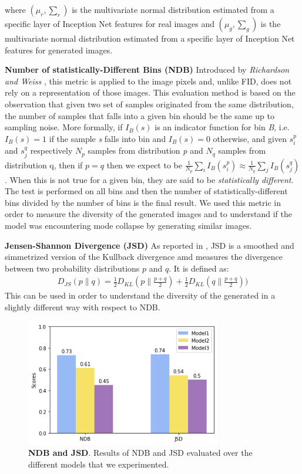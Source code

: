 \documentclass[10pt,twocolumn,letterpaper]{article}
\begin{document}
where $\textstyle (\mu_{r} , \sum_{r})$ is the multivariate normal distribution estimated from a specific layer of Inception Net features for real images and $\textstyle (\mu_{g} , \sum_{g})$ is the multivariate normal distribution estimated from a specific layer of Inception Net features for generated images. 

\textbf{Number of statistically-Different Bins (NDB)} Introduced by \textit{Richardson and Weiss} \cite{ndb}, this metric is applied to the image pixels and, unlike FID, does not rely on a representation of those images. This evaluation method is based on the observation that given two set of samples originated from the same distribution, the number of samples that falls into a given bin should be the same up to sampling noise. More formally, if $I_{B}(s)$ is an indicator function for bin \textit{B}, i.e. $I_{B}(s)=1$ if the sample \textit{s} falls into bin  and $I_{B}(s)=0$ otherwise, and given ${s_{i}^{p}}$ and ${s_{j}^{q}}$ respectively ${N_{p}}$ samples from distribution \textit{p} and ${N_{q}}$ samples from distribution q, then if $p=q$ then we expect to be $\textstyle \frac{1}{N_p}\sum_{i}{I_B(s_{i}^{p})} \approx \frac{1}{N_q}\sum_{j}{I_B(s_{j}^{q})} $. When this is not true for a given bin, they are said to be \textit{statistically different}. The test is performed on all bins and then the number of statistically-different bins divided by the number of bins is the final result. We used this metric in order to measure the diversity of the generated images and to understand if the model was encountering mode collapse by generating similar images. 

\textbf{Jensen-Shannon Divergence (JSD)} As reported in \cite{jsd}, JSD is a smoothed and simmetrized version of the Kullback divergence amd measures the divergence between two probability distributions $p$ and $q$. It is defined as: 
\begin{equation}
	\begin{split}
		D_{JS}(p\|q) = \frac{1}{2}D_{KL}(p\|\frac{p+q}{2})+  \frac{1}{2}D_{KL}(q\|\frac{p+q}{2}))
	\end{split}
\end{equation}
This can be used in order to understand the diversity of the generated in a slightly different way with respect to NDB.


\begin{figure}
	\includegraphics[width=23em]{index.png}
	\caption{\textbf{NDB and JSD}. Results of NDB and JSD evaluated over the different models that we experimented.}
	\label{figure:ndb-jsd}
\end{figure}
\end{document}
